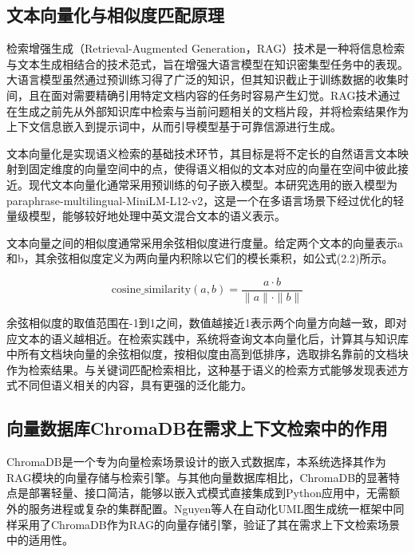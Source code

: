 \subsection{文本向量化与相似度匹配原理}

检索增强生成（Retrieval-Augmented Generation，RAG）技术是一种将信息检索与文本生成相结合的技术范式，旨在增强大语言模型在知识密集型任务中的表现\cite{brown2025systematic}。大语言模型虽然通过预训练习得了广泛的知识，但其知识截止于训练数据的收集时间，且在面对需要精确引用特定文档内容的任务时容易产生幻觉。RAG技术通过在生成之前先从外部知识库中检索与当前问题相关的文档片段，并将检索结果作为上下文信息嵌入到提示词中，从而引导模型基于可靠信源进行生成。

文本向量化是实现语义检索的基础技术环节，其目标是将不定长的自然语言文本映射到固定维度的向量空间中的点，使得语义相似的文本对应的向量在空间中彼此接近。现代文本向量化通常采用预训练的句子嵌入模型。本研究选用的嵌入模型为paraphrase-multilingual-MiniLM-L12-v2，这是一个在多语言场景下经过优化的轻量级模型，能够较好地处理中英文混合文本的语义表示。

文本向量之间的相似度通常采用余弦相似度进行度量。给定两个文本的向量表示a和b，其余弦相似度定义为两向量内积除以它们的模长乘积，如公式(2.2)所示。

\begin{equation}
    \text{cosine\_similarity}(a, b) = \frac{a \cdot b}{\|a\| \cdot \|b\|}
    \label{eq:cosine}
\end{equation}

余弦相似度的取值范围在-1到1之间，数值越接近1表示两个向量方向越一致，即对应文本的语义越相近。在检索实践中，系统将查询文本向量化后，计算其与知识库中所有文档块向量的余弦相似度，按相似度由高到低排序，选取排名靠前的文档块作为检索结果。与关键词匹配检索相比，这种基于语义的检索方式能够发现表述方式不同但语义相关的内容，具有更强的泛化能力。

\subsection{向量数据库ChromaDB在需求上下文检索中的作用}

ChromaDB是一个专为向量检索场景设计的嵌入式数据库，本系统选择其作为RAG模块的向量存储与检索引擎。与其他向量数据库相比，ChromaDB的显著特点是部署轻量、接口简洁，能够以嵌入式模式直接集成到Python应用中，无需额外的服务进程或复杂的集群配置。Nguyen等人\cite{nguyen2026novel}在自动化UML图生成统一框架中同样采用了ChromaDB作为RAG的向量存储引擎，验证了其在需求上下文检索场景中的适用性。

